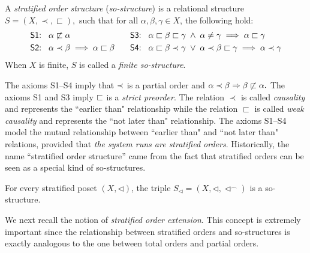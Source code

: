 \documentclass{llncs}
\begin{document}
\begin{definition}
A \emph{stratified order structure} (\emph{so-structure}) is a relational structure $S=(X,\prec,\sqsubset),$ such that for all $\alpha,\beta,\gamma \in X$, the following hold:
\begin{align*}
\text{\textsf{S1:}\hspace{3mm}}& \alpha\not\sqsubset \alpha & \text{\textsf{S3:}\hspace{3mm}}& \alpha\sqsubset \beta \sqsubset \gamma \;\wedge\; \alpha \not= \gamma \implies \alpha\sqsubset \gamma\\
\text{\textsf{S2:}\hspace{3mm}}& \alpha \prec \beta \implies \alpha \sqsubset \beta \hspace{3mm}& \text{\textsf{S4:}\hspace{3mm}}&
\alpha\sqsubset \beta \prec \gamma \;\vee\; \alpha\prec \beta \sqsubset \gamma \implies \alpha\prec \gamma
\end{align*}
When $X$ is finite, $S$ is called a \emph{finite so-structure}. \EOD
\label{def:sos}
\end{definition}


The axioms \textsf{S1}--\textsf{S4} imply that $\prec$ is a partial order and $\alpha\prec \beta\Rightarrow \beta\not\sqsubset \alpha.$  The axioms \textsf{S1} and \textsf{S3} imply $\sqsubset$ is a \emph{strict preorder}. The relation $\prec$ is called \textit{causality} and represents the ``earlier than" relationship while the relation $\sqsubset$ is called \textit{weak causality} and represents the ``not later than" relationship. The axioms \textsf{S1}--\textsf{S4} model the mutual relationship between ``earlier than" and ``not later than" relations, provided that {\em the system runs are stratified orders}.  Historically, the name ``stratified order structure'' came from the fact that stratified orders can be seen as a special kind of so-structures.



\begin{proposition}[\cite{J4}]
For every stratified poset $(X,\lhd)$, the triple $S_\lhd=(X,\lhd,\lhd^\frown)$ is a so-structure.\END
\label{prop:soss}
\end{proposition}

We next recall the notion of \emph{stratified order extension}. This concept is extremely important  since the relationship between stratified orders and so-structures is exactly analogous to the one between total orders and partial orders.
\end{document}
